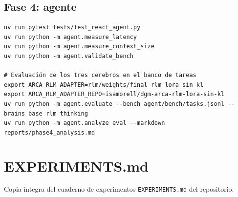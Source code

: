 \subsection*{Fase 4: agente}
\begin{lstlisting}
uv run pytest tests/test_react_agent.py
uv run python -m agent.measure_latency
uv run python -m agent.measure_context_size
uv run python -m agent.validate_bench

# Evaluación de los tres cerebros en el banco de tareas
export ARCA_RLM_ADAPTER=rlm/weights/final_rlm_lora_sin_kl
export ARCA_RLM_ADAPTER_REPO=isamorell/dgm-arca-rlm-lora-sin-kl
uv run python -m agent.evaluate --bench agent/bench/tasks.jsonl --brains base rlm thinking
uv run python -m agent.analyze_eval --markdown reports/phase4_analysis.md
\end{lstlisting}

\section{EXPERIMENTS.md}
\label{anx:experiments}
Copia íntegra del cuaderno de experimentos \texttt{EXPERIMENTS.md} del repositorio.

